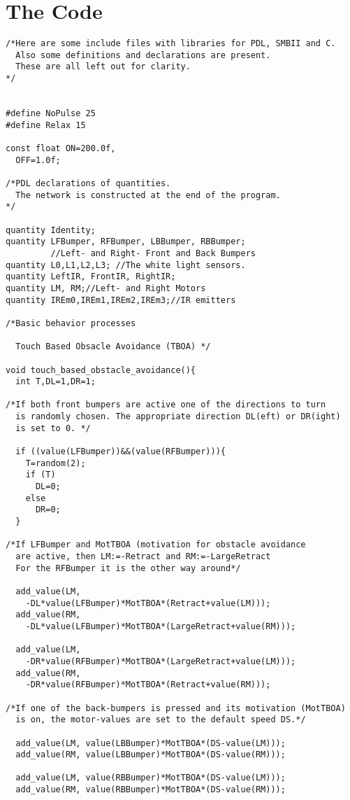 \section*{The Code}
{\scriptsize\begin{verbatim}
/*Here are some include files with libraries for PDL, SMBII and C.
  Also some definitions and declarations are present.
  These are all left out for clarity.
*/


#define NoPulse 25
#define Relax 15

const float ON=200.0f,
  OFF=1.0f;

/*PDL declarations of quantities. 
  The network is constructed at the end of the program.
*/

quantity Identity;
quantity LFBumper, RFBumper, LBBumper, RBBumper;
         //Left- and Right- Front and Back Bumpers
quantity L0,L1,L2,L3; //The white light sensors.
quantity LeftIR, FrontIR, RightIR;
quantity LM, RM;//Left- and Right Motors
quantity IREm0,IREm1,IREm2,IREm3;//IR emitters

/*Basic behavior processes

  Touch Based Obsacle Avoidance (TBOA) */

void touch_based_obstacle_avoidance(){
  int T,DL=1,DR=1;	
  
/*If both front bumpers are active one of the directions to turn
  is randomly chosen. The appropriate direction DL(eft) or DR(ight)
  is set to 0. */

  if ((value(LFBumper))&&(value(RFBumper))){
    T=random(2);
    if (T)
      DL=0;
    else
      DR=0;
  }

/*If LFBumper and MotTBOA (motivation for obstacle avoidance
  are active, then LM:=-Retract and RM:=-LargeRetract
  For the RFBumper it is the other way around*/

  add_value(LM, 
    -DL*value(LFBumper)*MotTBOA*(Retract+value(LM)));
  add_value(RM, 
    -DL*value(LFBumper)*MotTBOA*(LargeRetract+value(RM)));

  add_value(LM, 
    -DR*value(RFBumper)*MotTBOA*(LargeRetract+value(LM)));
  add_value(RM, 
    -DR*value(RFBumper)*MotTBOA*(Retract+value(RM)));
  
/*If one of the back-bumpers is pressed and its motivation (MotTBOA) 
  is on, the motor-values are set to the default speed DS.*/

  add_value(LM, value(LBBumper)*MotTBOA*(DS-value(LM)));
  add_value(RM, value(LBBumper)*MotTBOA*(DS-value(RM)));

  add_value(LM, value(RBBumper)*MotTBOA*(DS-value(LM)));
  add_value(RM, value(RBBumper)*MotTBOA*(DS-value(RM)));


\end{verbatim}}
